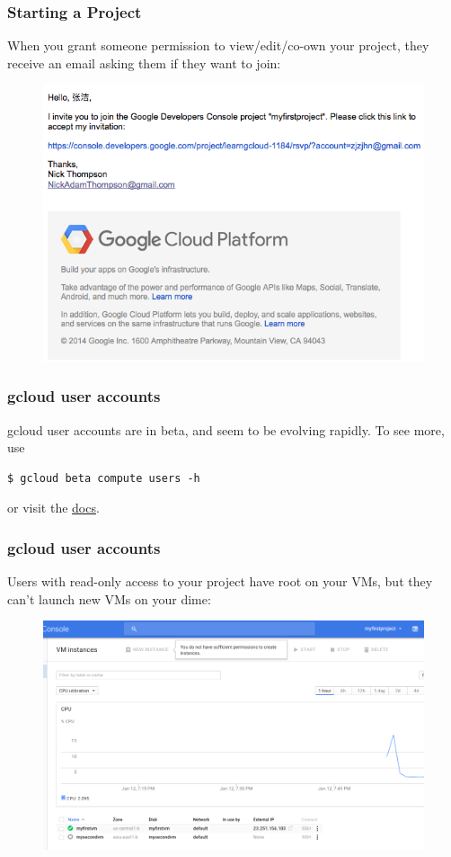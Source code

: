 \documentclass[9pt]{beamer}
\begin{document}
\begin{frame}[fragile]
  \frametitle{Starting a Project}
  When you grant someone permission to view/edit/co-own your project, they receive an email asking them if they want to join:
  \begin{figure}
    \includegraphics[scale=0.4]{figures/EmailConfirmation.png}
  \end{figure}
\end{frame}

\begin{frame}[fragile]
  \frametitle{gcloud user accounts}
  gcloud user accounts are in beta, and seem to be evolving rapidly. To see more, use
  \begin{verbatim}
$ gcloud beta compute users -h
  \end{verbatim}
or visit the \href{https://cloud.google.com/compute/docs/access/user-accounts/}{docs}.
\end{frame}

\begin{frame}[fragile]
  \frametitle{gcloud user accounts}
  Users with read-only access to your project have root on your VMs, but they can't launch new VMs on your dime:
  \begin{figure}
    \includegraphics[scale=0.2]{figures/CantCreateVM.png}
  \end{figure}
\end{frame}
\end{document}

